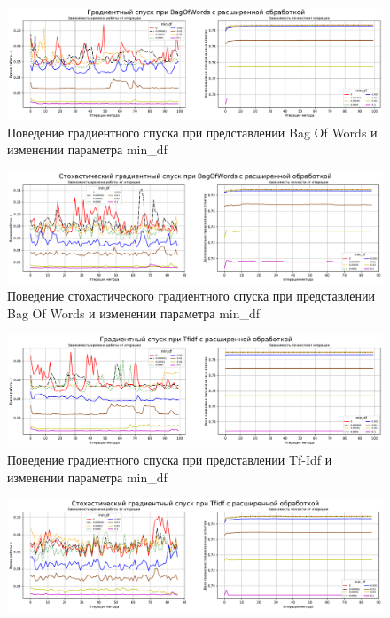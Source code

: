 \documentclass{article}
\begin{document}
\begin{itemize}
\begin{figure}[H]
	\centering
	\includegraphics[width=14cm]{TASK2 min_df BagOfWords GD.pdf}
	\caption{Поведение градиентного спуска при представлении Bag Of Words и изменении параметра min\_df}
	\label{fig:min_df_BagOfWords_GD}
\end{figure}
\begin{figure}[H]
	\centering
	\includegraphics[width=14cm]{TASK2 min_df BagOfWords SGD.pdf}
	\caption{Поведение стохастического градиентного спуска при представлении Bag Of Words и изменении параметра min\_df}
	\label{fig:min_df_BagOfWords_SGD}
\end{figure}
\begin{figure}[H]
	\centering
	\includegraphics[width=14cm]{TASK2 min_df Tfidf GD.pdf}
	\caption{Поведение градиентного спуска при представлении Tf-Idf и изменении параметра min\_df}
	\label{fig:min_df_Tfidf_GD}
\end{figure}
\begin{figure}[H]
	\centering
	\includegraphics[width=14cm]{TASK2 min_df Tfidf SGD.pdf}

\end{figure}
\end{itemize}
\end{document}
